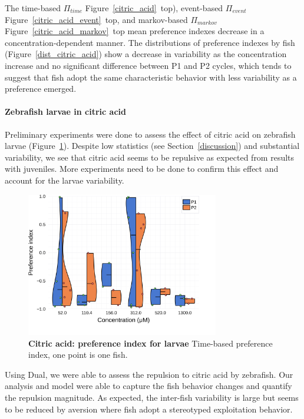   The time-based $\Pi_{time}$ Figure~\ref{citric_acid}~top), event-based $\Pi_{event}$ Figure~\ref{citric_acid_event}~top, and markov-based $\Pi_{markov}$ Figure~\ref{citric_acid_markov}~top mean preference indexes decrease in a concentration-dependent manner. The distributions of preference indexes by fish (Figure~\ref{dist_citric_acid}) show a decrease in variability as the concentration increase and no significant difference between P1 and P2 cycles, which tends to suggest that fish adopt the same characteristic behavior with less variability as a preference emerged.

  \paragraph{Zebrafish larvae in citric acid} Preliminary experiments were done to assess the effect of citric acid on zebrafish larvae (Figure~\ref{dist_citric_acid_lar}). Despite low statistics (see Section~\ref{discussion}) and substantial variability, we see that citric acid seems to be repulsive as expected from results with juveniles. More experiments need to be done to confirm this effect and account for the larvae variability.

    \begin{figure}[h!]
      \centering
      \includegraphics[width=0.75\textwidth]{part_2/assets/dist_citricacid_lar.png}
      \caption{\textbf{Citric acid: preference index for larvae} Time-based preference index, one point is one fish.}
      \label{dist_citric_acid_lar}
    \end{figure}

  Using Dual, we were able to assess the repulsion to citric acid by zebrafish. Our analysis and model were able to capture the fish behavior changes and quantify the repulsion magnitude. As expected, the inter-fish variability is large but seems to be reduced by aversion where fish adopt a stereotyped exploitation behavior.

